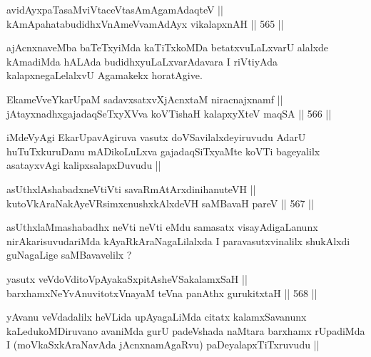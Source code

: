 
\begin{shl}
avidAyxpaTasaMviVtaceVtasAmAgamAdaqteV || \\
kAmApahatabudidhxVnAmeVvamAdAyx vikalapxnAH ||  565 ||  
\end{shl}

\begin{artha}
ajAcnxnaveMba baTeTxyiMda kaTiTxkoMDa betatxvuLaLxvarU alalxde
kAmadiMda hALAda budidhxyuLaLxvarAdavara I riVtiyAda
kalapxnegaLelalxvU Agamakekx horatAgive.
\end{artha}

\begin{shl}
EkameVveYkarUpaM sadavxsatxvXjAcnxtaM niracnajxnamf || \\
jAtayxnadhxgajadaqSeTxyXVva koVTishaH kalapxyXteV maqSA ||  566 ||  
\end{shl}

\begin{artha}
iMdeVyAgi EkarUpavAgiruva vasutx doVSavilalxdeyiruvudu AdarU
huTuTxkuruDanu mADikoLuLxva gajadaqSiTxyaMte koVTi bageyalilx
asatayxvAgi kalipxsalapxDuvudu ||
\end{artha}


\begin{shl}
asUthxlAshabadxneVtiVti savaRmAtArxdinihanuteVH || \\
kutoV\s kAraNakAyeVR\s simxcnushxkAlxdeVH saMBavaH pareV ||  567 ||  
\end{shl}

\begin{artha}
asUthxlaMmashabadhx neVti neVti eMdu samasatx visayAdigaLanunx
nirAkarisuvudariMda kAyaRkAraNagaLilalxda I paravasutxvinalilx
shukAlxdi guNagaLige saMBavavelilx ?
\end{artha}


\begin{shl}
yasutx veVdoVditoVpAyakaSxpitAsheVSakalamxSaH || \\
barxhamxNeYvAnuvitotxVnayaM teVna panAthx gurukitxtaH ||  568 ||  
\end{shl}

\begin{artha}
yAvanu veVdadalilx heVLida upAyagaLiMda citatx kalamxSavanunx
kaLedukoMDiruvano avaniMda gurU padeVshada naMtara barxhamx rUpadiMda
I (moVkaSxkAraNavAda jAcnxnamAgaRvu) paDeyalapxTiTxruvudu ||
\end{artha}

